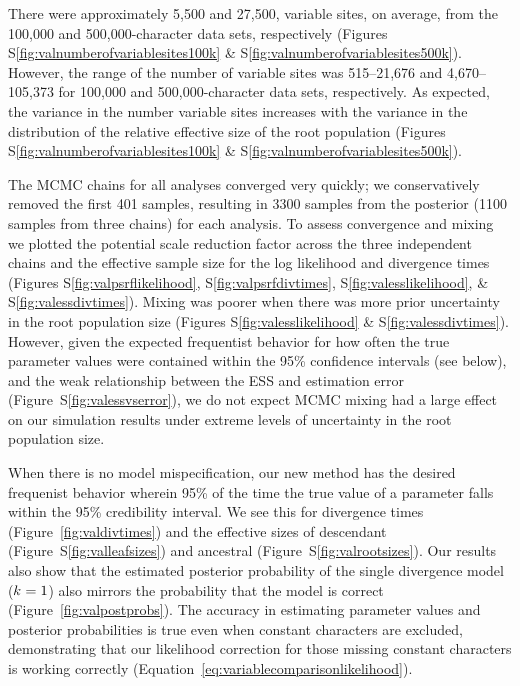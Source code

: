 There were approximately 5,500 and 27,500, variable sites, on average, from the
100,000 and 500,000-character data sets, respectively
(Figures S\ref{fig:valnumberofvariablesites100k} \&
S\ref{fig:valnumberofvariablesites500k}).
However, the range of the number of variable sites was 515--21,676 
and 4,670--105,373 for 100,000 and 500,000-character data sets, respectively.
As expected, the variance in the number variable sites increases with the
variance in the distribution of the relative effective size of the root
population
(Figures S\ref{fig:valnumberofvariablesites100k} \&
S\ref{fig:valnumberofvariablesites500k}).

The MCMC chains for all analyses converged very quickly;
we conservatively removed the first 401 samples, resulting in 3300 samples from
the posterior (1100 samples from three chains) for each analysis.
To assess convergence and mixing we plotted the potential scale reduction
factor across the three independent chains and the effective sample size for
the log likelihood and divergence times
(Figures S\ref{fig:valpsrflikelihood}, S\ref{fig:valpsrfdivtimes},
S\ref{fig:valesslikelihood}, \& S\ref{fig:valessdivtimes}).
Mixing was poorer when there was more prior uncertainty in the root population
size
(Figures S\ref{fig:valesslikelihood} \& S\ref{fig:valessdivtimes}).
However, given the expected frequentist behavior for how often the true
parameter values were contained within the 95\% confidence intervals (see
below), and the weak relationship between the ESS and estimation error
(Figure~S\ref{fig:valessvserror}),
we do not expect MCMC mixing had a large effect on our simulation results under
extreme levels of uncertainty in the root population size.

When there is no model mispecification, our new method has the desired
frequenist behavior wherein 95\% of the time the true value of a parameter
falls within the 95\% credibility interval.
We see this for
divergence times
(Figure~\ref{fig:valdivtimes})
and the effective sizes of
descendant
(Figure~S\ref{fig:valleafsizes})
and ancestral
(Figure~S\ref{fig:valrootsizes}).
Our results also show that the estimated posterior probability of the single
divergence model ($k_{} = 1$) also mirrors the probability that the model
is correct 
(Figure~\ref{fig:valpostprobs}).
The accuracy in estimating parameter values and posterior
probabilities is true even when constant characters are excluded, demonstrating
that our likelihood correction for those missing constant characters is working
correctly
(Equation~\ref{eq:variablecomparisonlikelihood}).

